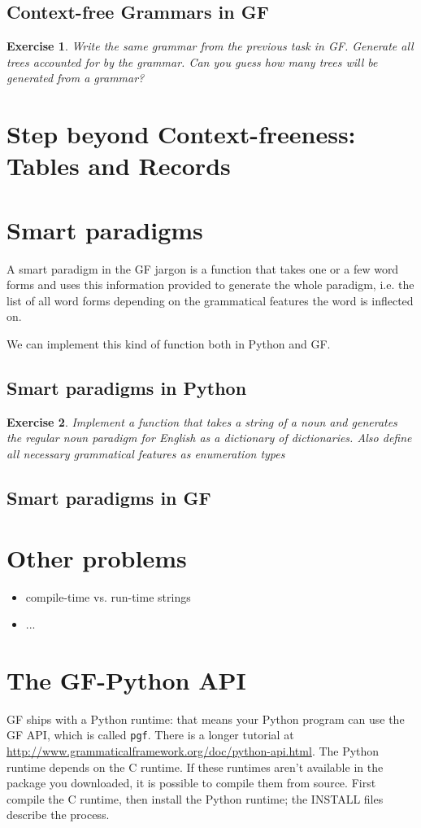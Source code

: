 \documentclass{scrartcl}
\newtheorem{exercise}{Exercise}
\begin{document}
\subsection{Context-free Grammars in GF}



\begin{exercise}
  Write the same grammar from the previous task in GF. Generate all trees accounted for by the grammar. Can you guess how many trees will be
  generated from a grammar?
\end{exercise}
\section{Step beyond Context-freeness: Tables and Records}
\section{Smart paradigms}
A smart paradigm in the GF jargon is a function that takes one or a few word forms and uses this information provided to generate the whole paradigm, i.e. the list of all word forms depending on the grammatical features the word is inflected on.

We can implement this kind of function both in Python and GF.
\subsection{Smart paradigms in Python}
\begin{exercise}
  Implement a function that takes a string of a noun and generates the regular noun paradigm for English as a dictionary of dictionaries. Also define all necessary grammatical features as enumeration types
\end{exercise}

\subsection{Smart paradigms in GF}


\section{Other problems}
\begin{itemize}
\item compile-time vs. run-time strings
\item ...
\end{itemize}
\section{The GF-Python API}

GF ships with a Python runtime: that means your Python program can use the GF API, which is called \texttt{pgf}. There is a longer tutorial at \url{http://www.grammaticalframework.org/doc/python-api.html}. The Python runtime depends on the C runtime. If these runtimes aren't available in the package you downloaded, it is possible to compile them from source. First compile the C runtime, then install the Python runtime; the INSTALL files describe the process.
\end{document}
